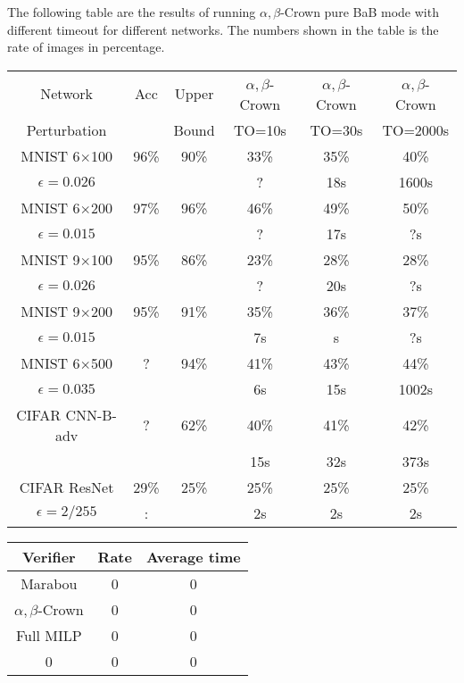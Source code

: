 \documentclass{article} %
\theoremstyle{definition}
\begin{document}
The following table are the results of running $\alpha,\beta$-Crown pure BaB mode with different timeout for different networks. The numbers shown in the table is the rate of images in percentage.

\begin{tabular}{||c|c|c||c|c|c||}
	\hline
	Network & Acc & Upper  & $\alpha,\beta$-Crown& $\alpha,\beta$-Crown & $\alpha,\beta$-Crown \\ 
	Perturbation &   & Bound & TO=10s & TO=30s & TO=2000s\\ \hline

	MNIST 6$\times$100 & 96\% & 90\% & 33\% & 35\% & 40\%   \\
	$\epsilon = 0.026$ &  &  & ? &  18s &  1600s  \\  \hline
    MNIST 6$\times$200 & 97\%  & 96\%  & 46\%  & 49\%  & 50\%   \\ 
	$\epsilon = 0.015$ & &  & ? &  17s &  ?s  \\  \hline
	MNIST 9$\times$100 & 95\%  & 86\%  & 23\%  & 28\%  & 28\%   \\
	$\epsilon = 0.026$ &  &  & ? &  20s &  ?s  \\  \hline
	MNIST 9$\times$200 & 95\%  & 91\%  & 35\%  & 36\%  & 37\%   \\ 
	$\epsilon = 0.015$ & &  & 7s &  s &  ?s  \\  \hline
	MNIST 6$\times$500 &  ? & 94\%  & 41\%  & 43\%  & 44\%   \\ 
	$\epsilon = 0.035$ & &  & 6s &  15s &  1002s  \\  \hline
	CIFAR CNN-B-adv & ?  & 62\%  &  40\% & 41\%  & 42\%   \\
	 &  &  & 15s & 32s & 373s  \\ \hline \hline
	CIFAR ResNet & 29\%  & 25\%  & 25\%  & 25\%  & 25\%   \\
	$\epsilon=2/255$ & : &  & 2s & 2s & 2s  \\ \hline
	

\end{tabular}

\vspace*{4ex}
\begin{tabular}{|c|c|c|}
	\hline
	Verifier & Rate & Average time \\ \hline
	Marabou & 0 & 0 \\ \hline
	$\alpha,\beta$-Crown & 0 & 0 \\ \hline
	Full MILP & 0 & 0 \\ \hline
	0 & 0 & 0 \\ \hline
\end{tabular}
\end{document}
